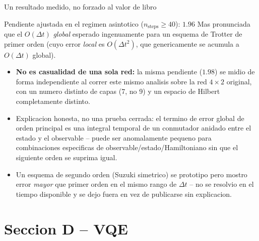\documentclass[aspectratio=169,10pt]{beamer}
\newcommand{\good}[1]{\textcolor{qAccent}{\textbf{#1}}}
\begin{document}
\begin{frame}{Un resultado medido, no forzado al valor de libro}
  \begin{alertblock}{Pendiente ajustada en el regimen asintotico ($n_{\text{steps}}\geq40$):
    $\mathbf{1.96}$}
    Mas pronunciada que el $O(\Delta t)$ \emph{global} esperado ingenuamente para un esquema
    de Trotter de primer orden (cuyo error \emph{local} es $O(\Delta t^2)$, que
    genericamente se acumula a $O(\Delta t)$ global).
  \end{alertblock}
  \begin{itemize}
    \item \good{No es casualidad de una sola red:} la misma pendiente ($1.98$) se midio de
      forma independiente al correr este mismo analisis sobre la red $4\times2$ original,
      con un numero distinto de capas (7, no 9) y un espacio de Hilbert completamente
      distinto.
    \item Explicacion honesta, no una prueba cerrada: el termino de error global de orden
      principal es una integral temporal de un conmutador anidado entre el estado y el
      observable -- puede ser anomalamente pequeno para combinaciones especificas de
      observable/estado/Hamiltoniano sin que el siguiente orden se suprima igual.
    \item Un esquema de segundo orden (Suzuki simetrico) se prototipo pero mostro error
      \emph{mayor} que primer orden en el mismo rango de $\Delta t$ -- no se resolvio en el
      tiempo disponible y se dejo fuera en vez de publicarse sin explicacion.
  \end{itemize}
\end{frame}

\section{Seccion D -- VQE}
\end{document}
